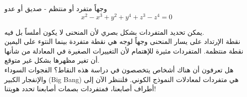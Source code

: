 \begin{surferPage}[وجهاً ]{وجهاً  }
متفرد أو منتظم - صديق أو عدو\\
\smallskip
\[x^2	- x^3+ y^2+ y^4+ z^3- z^4	=  0\]

\vspace{0.3cm}
يمكن تحديد المتفردات بشكل بصري لأن المنحنى لا يكون أملساً بل فيه.\\
\vspace{0.3cm}
نقطة الإرتداد على يسار المنحنى وجهاً لوجه هي نقطة متفردة بينما النتوء على اليمين نقطة منتظمة. المتفردات مثيرة للإهتمام لأن التغييرات الصغيرة في المعادلة من شأنها أن تغير مظهرها بشكل غير متوقع. \\ 

\vspace{0.3cm}
هل تعرفون أن هناك أشخاص يتخصصون في دراسة هذه النقاط؟ الفجوات السوداء والإنفجار الكبير
 \textenglish{(Big Bang)}
  هي متفردات لمعادلات النموذج الكوني. فلننظر الآن إلى أطراف أصابعنا، فمتفردات بصمات أصابعنا تحدد هويتنا!
\end{surferPage}
